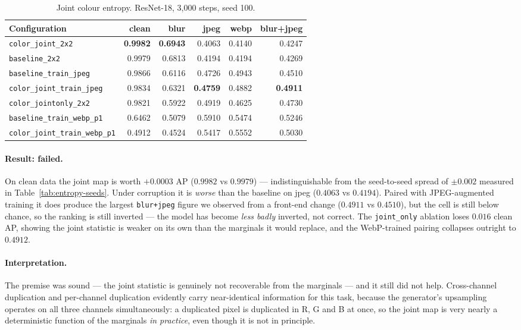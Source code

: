 \begin{table}[t]
  \centering
  \caption{Joint colour entropy. ResNet-18, 3{,}000 steps, seed 100.}
  \label{tab:color}
  \begin{tabular}{lrrrrr}
    \toprule
    Configuration & clean & blur & jpeg & webp & blur+jpeg \\
    \midrule
    \texttt{color\_joint\_2x2}          & \textbf{0.9982} & \textbf{0.6943} & 0.4063 & 0.4140 & 0.4247 \\
    \texttt{baseline\_2x2}              & 0.9979 & 0.6813 & 0.4194 & 0.4194 & 0.4269 \\
    \texttt{baseline\_train\_jpeg}      & 0.9866 & 0.6116 & 0.4726 & 0.4943 & 0.4510 \\
    \texttt{color\_joint\_train\_jpeg}  & 0.9834 & 0.6321 & \textbf{0.4759} & 0.4882 & \textbf{0.4911} \\
    \texttt{color\_jointonly\_2x2}      & 0.9821 & 0.5922 & 0.4919 & 0.4625 & 0.4730 \\
    \texttt{baseline\_train\_webp\_p1}  & 0.6462 & 0.5079 & 0.5910 & 0.5474 & 0.5246 \\
    \texttt{color\_joint\_train\_webp\_p1} & 0.4912 & 0.4524 & 0.5417 & 0.5552 & 0.5030 \\
    \bottomrule
  \end{tabular}
\end{table}

\paragraph{Result: failed.} On clean data the joint map is worth $+0.0003$ AP
($0.9982$ vs $0.9979$) --- indistinguishable from the seed-to-seed spread of
$\pm0.002$ measured in Table~\ref{tab:entropy-seeds}. Under corruption it is
\emph{worse} than the baseline on jpeg ($0.4063$ vs $0.4194$). Paired with
JPEG-augmented training it does produce the largest \texttt{blur+jpeg} figure we
observed from a front-end change ($0.4911$ vs $0.4510$), but the cell is still
below chance, so the ranking is still inverted --- the model has become
\emph{less badly} inverted, not correct. The \texttt{joint\_only} ablation loses
$0.016$ clean AP, showing the joint statistic is weaker on its own than the
marginals it would replace, and the WebP-trained pairing collapses outright to
$0.4912$.

\paragraph{Interpretation.} The premise was sound --- the joint statistic is
genuinely not recoverable from the marginals --- and it still did not help.
Cross-channel duplication and per-channel duplication evidently carry
near-identical information for this task, because the generator's upsampling
operates on all three channels simultaneously: a duplicated pixel is duplicated
in R, G and B at once, so the joint map is very nearly a deterministic function
of the marginals \emph{in practice}, even though it is not in principle.

